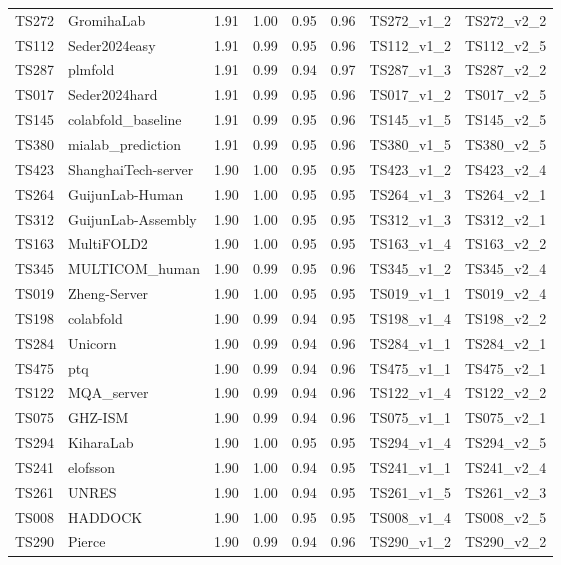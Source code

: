 \begin{longtable}{llllllll}
TS272 & GromihaLab & 1.91 & 1.00 & 0.95 & 0.96 & TS272\_v1\_2 & TS272\_v2\_2 \\ 
TS112 & Seder2024easy & 1.91 & 0.99 & 0.95 & 0.96 & TS112\_v1\_2 & TS112\_v2\_5 \\ 
TS287 & plmfold & 1.91 & 0.99 & 0.94 & 0.97 & TS287\_v1\_3 & TS287\_v2\_2 \\ 
TS017 & Seder2024hard & 1.91 & 0.99 & 0.95 & 0.96 & TS017\_v1\_2 & TS017\_v2\_5 \\ 
TS145 & colabfold\_baseline & 1.91 & 0.99 & 0.95 & 0.96 & TS145\_v1\_5 & TS145\_v2\_5 \\ 
TS380 & mialab\_prediction & 1.91 & 0.99 & 0.95 & 0.96 & TS380\_v1\_5 & TS380\_v2\_5 \\ 
TS423 & ShanghaiTech-server & 1.90 & 1.00 & 0.95 & 0.95 & TS423\_v1\_2 & TS423\_v2\_4 \\ 
TS264 & GuijunLab-Human & 1.90 & 1.00 & 0.95 & 0.95 & TS264\_v1\_3 & TS264\_v2\_1 \\ 
TS312 & GuijunLab-Assembly & 1.90 & 1.00 & 0.95 & 0.95 & TS312\_v1\_3 & TS312\_v2\_1 \\ 
TS163 & MultiFOLD2 & 1.90 & 1.00 & 0.95 & 0.95 & TS163\_v1\_4 & TS163\_v2\_2 \\ 
TS345 & MULTICOM\_human & 1.90 & 0.99 & 0.95 & 0.96 & TS345\_v1\_2 & TS345\_v2\_4 \\ 
TS019 & Zheng-Server & 1.90 & 1.00 & 0.95 & 0.95 & TS019\_v1\_1 & TS019\_v2\_4 \\ 
TS198 & colabfold & 1.90 & 0.99 & 0.94 & 0.95 & TS198\_v1\_4 & TS198\_v2\_2 \\ 
TS284 & Unicorn & 1.90 & 0.99 & 0.94 & 0.96 & TS284\_v1\_1 & TS284\_v2\_1 \\ 
TS475 & ptq & 1.90 & 0.99 & 0.94 & 0.96 & TS475\_v1\_1 & TS475\_v2\_1 \\ 
TS122 & MQA\_server & 1.90 & 0.99 & 0.94 & 0.96 & TS122\_v1\_4 & TS122\_v2\_2 \\ 
TS075 & GHZ-ISM & 1.90 & 0.99 & 0.94 & 0.96 & TS075\_v1\_1 & TS075\_v2\_1 \\ 
TS294 & KiharaLab & 1.90 & 1.00 & 0.95 & 0.95 & TS294\_v1\_4 & TS294\_v2\_5 \\ 
TS241 & elofsson & 1.90 & 1.00 & 0.94 & 0.95 & TS241\_v1\_1 & TS241\_v2\_4 \\ 
TS261 & UNRES & 1.90 & 1.00 & 0.94 & 0.95 & TS261\_v1\_5 & TS261\_v2\_3 \\ 
TS008 & HADDOCK & 1.90 & 1.00 & 0.95 & 0.95 & TS008\_v1\_4 & TS008\_v2\_5 \\ 
TS290 & Pierce & 1.90 & 0.99 & 0.94 & 0.96 & TS290\_v1\_2 & TS290\_v2\_2 \\ 

\end{longtable}
